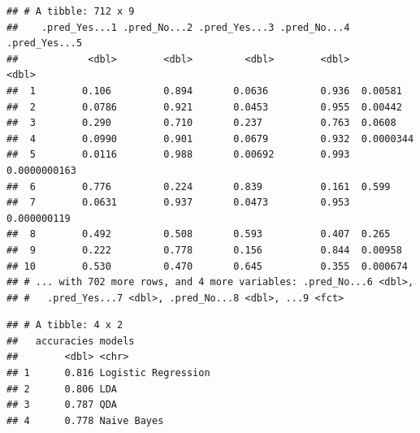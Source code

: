 \documentclass[
]{article}
\newenvironment{Shaded}{\begin{snugshade}}{\end{snugshade}}
\newcommand{\AttributeTok}[1]{\textcolor[rgb]{0.77,0.63,0.00}{#1}}
\newcommand{\CommentTok}[1]{\textcolor[rgb]{0.56,0.35,0.01}{\textit{#1}}}
\newcommand{\FunctionTok}[1]{\textcolor[rgb]{0.00,0.00,0.00}{#1}}
\newcommand{\NormalTok}[1]{#1}
\newcommand{\OtherTok}[1]{\textcolor[rgb]{0.56,0.35,0.01}{#1}}
\newcommand{\SpecialCharTok}[1]{\textcolor[rgb]{0.00,0.00,0.00}{#1}}
\newcommand{\StringTok}[1]{\textcolor[rgb]{0.31,0.60,0.02}{#1}}
\begin{document}
\begin{verbatim}
## # A tibble: 712 x 9
##    .pred_Yes...1 .pred_No...2 .pred_Yes...3 .pred_No...4 .pred_Yes...5
##            <dbl>        <dbl>         <dbl>        <dbl>         <dbl>
##  1        0.106         0.894       0.0636         0.936  0.00581     
##  2        0.0786        0.921       0.0453         0.955  0.00442     
##  3        0.290         0.710       0.237          0.763  0.0608      
##  4        0.0990        0.901       0.0679         0.932  0.0000344   
##  5        0.0116        0.988       0.00692        0.993  0.0000000163
##  6        0.776         0.224       0.839          0.161  0.599       
##  7        0.0631        0.937       0.0473         0.953  0.000000119 
##  8        0.492         0.508       0.593          0.407  0.265       
##  9        0.222         0.778       0.156          0.844  0.00958     
## 10        0.530         0.470       0.645          0.355  0.000674    
## # ... with 702 more rows, and 4 more variables: .pred_No...6 <dbl>,
## #   .pred_Yes...7 <dbl>, .pred_No...8 <dbl>, ...9 <fct>
\end{verbatim}

\begin{Shaded}
\end{Shaded}

\begin{verbatim}
## # A tibble: 4 x 2
##   accuracies models             
##        <dbl> <chr>              
## 1      0.816 Logistic Regression
## 2      0.806 LDA                
## 3      0.787 QDA                
## 4      0.778 Naive Bayes
\end{verbatim}
\end{document}
